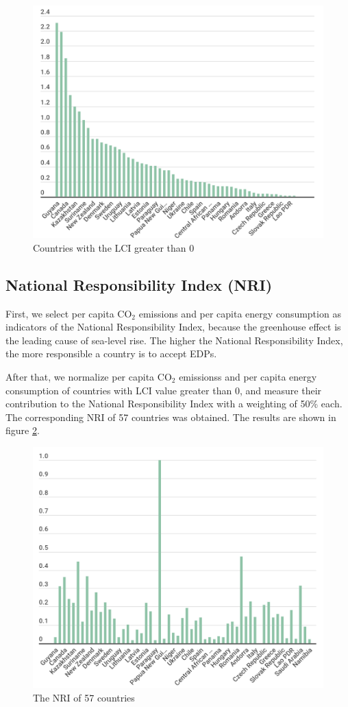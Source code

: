 \documentclass[12pt]{article}  %
\begin{document}
\begin{figure}[htbp]
	\centering
	\includegraphics[width=.8\textwidth]{LCI.png}
	\caption{ Countries with the LCI greater than 0 }
	\label{Countries_with_eligible_immigration_indices}
\end{figure}





\subsection{National Responsibility Index (NRI)}
First, we select per capita CO$_2$ emissions and per capita energy consumption as indicators of the National Responsibility Index, because the greenhouse effect is the leading cause of sea-level rise. The higher the National Responsibility Index, the more responsible a country is to accept EDPs.


After that, we normalize per capita CO$_2$ emissionss and per capita energy consumption of countries with LCI value greater than 0, and measure their contribution to the National Responsibility Index with a weighting of 50\% each. The corresponding NRI of 57 countries was obtained. The results are shown in figure \ref{NRI}.

\newpage
\begin{figure}[htbp]
	\centering
	\includegraphics[width=.8\textwidth]{NRI.png}
	\caption{ The NRI of 57 countries}\label{NRI}
\end{figure}
\end{document}
